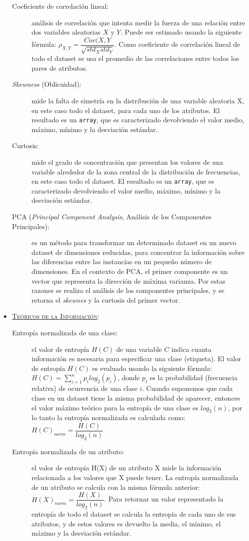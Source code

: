 \begin{itemize}
\begin{description}
		\item[Coeficiente de correlación lineal:] análisis de correlación que intenta medir la fuerza de una relación entre dos variables aleatorias $X$ y $Y$. Puede ser estimado usando la siguiente fórmula: $\rho_{X, Y} = \dfrac{Cov(X, Y}{\sqrt{std_X std_Y}}$. Como coeficiente de correlación lineal de todo el dataset se usa el promedio de las correlaciones entre todos los pares de atributos.
		\item[\textit{Skewness} (Oblicuidad):] mide la falta de simetría en la distribución de una variable aleatoria X, en este caso todo el dataset, para cada uno de los atributos. El resultado es un \texttt{array}, que es caracterizado devolviendo el valor medio, máximo, mínimo y la desviación estándar.
		\item[Curtosis:] mide el grado de concentración que presentan los valores de una variable alrededor de la zona central de la distribución de frecuencias, en este caso todo el dataset. El resultado es un \texttt{array}, que es caracterizado devolviendo el valor medio, máximo, mínimo y la desviación estándar.
		\item[PCA (\textit{Principal Component Analysis}, Análisis de los Componentes Principales):] es un método para transformar un determinado dataset en un nuevo dataset de dimensiones reducidas, para concentrar la información sobre las diferencias entre las instancias en un pequeño número de dimensiones. En el contexto de PCA, el primer componente es un vector que representa la dirección de máxima varianza. Por estas razones se realiza el análisis de los componentes principales, y se retorna el \textit{skewnes} y la curtosis del primer vector.
	\end{description}
	\item \underline{\textsc{Teóricos de la Información}}: \begin{description}
		\item[Entropía normalizada de una clase:]  el valor de entropía $H(C)$ de una variable $C$ indica cuanta información es necesaria para especificar una clase (etiqueta). El valor de entropía $H(C)$ es evaluado usando la siguiente fórmula: $H(C) = \sum^n_{i=1}p_i log_2(p_i)$, donde $p_i$ es la probabilidad (frecuencia relativa) de ocurrencia de una clase $i$. Cuando suponemos que cada clase en un dataset tiene la misma probabilidad de aparecer, entonces el valor máximo teórico para la entropía de una clase es $log_2(n)$, por lo tanto la entropía normalizada es calculada como: $H(C)_{norm} = \dfrac{H(C)}{log_2(n)}$
		\item[Entropía normalizada de un atributo:] el valor de entropía H(X) de un atributo X mide la información relacionada a los valores que X puede tener. La entropía normalizada de un atributo se calcula con la misma fórmula anterior: $H(X)_{norm} = \dfrac{H(X)}{log_2(n)}$. Para retornar un valor representado la entropía de todo el dataset se calcula la entropía de cada uno de sus atributos, y de estos valores es devuelto la media, el mínimo, el máximo y la desviación estándar.

\end{description}
\end{itemize}
